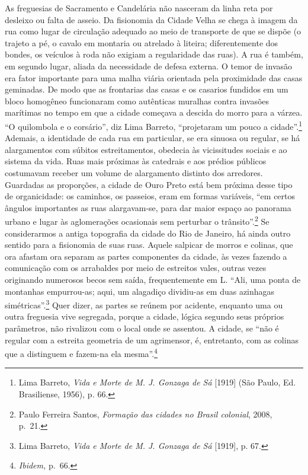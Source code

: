 As freguesias de Sacramento e Candelária não nasceram da linha reta por
desleixo ou falta de asseio. Da fisionomia da Cidade Velha se chega à
imagem da rua como lugar de circulação adequado ao meio de transporte de
que se dispõe (o trajeto a pé, o cavalo em montaria ou atrelado à
liteira; diferentemente dos bondes, os veículos à roda não exigiam a
regularidade das ruas). A rua é também, em segundo lugar, aliada da
necessidade de defesa externa. O temor de invasão era fator importante
para uma malha viária orientada pela proximidade das casas geminadas. De
modo que as frontarias das casas e os casarios fundidos em um bloco
homogêneo funcionaram como autênticas muralhas contra invasões marítimas
no tempo em que a cidade começava a descida do morro para a várzea. ``O
quilombola e o corsário'', diz Lima Barreto, ``projetaram um pouco a
cidade''.\footnote{Lima Barreto, \emph{Vida e Morte de M. J. Gonzaga de
  Sá} {[}1919{]} (São Paulo, Ed. Brasiliense, 1956), p\emph{.} 66.}
Ademais, a identidade de cada rua em particular, se era sinuosa ou
regular, se há alargamentos com súbitos estreitamentos, obedecia às
vicissitudes sociais e ao sistema da vida. Ruas mais próximas às
catedrais e aos prédios públicos costumavam receber um volume de
alargamento distinto dos arredores. Guardadas as proporções, a cidade de
Ouro Preto está bem próxima desse tipo de organicidade: os caminhos, os
passeios, eram em formas variáveis, ``em certos ângulos importantes as
ruas alargavam-se, para dar maior espaço ao panorama urbano e lugar às
aglomerações ocasionais sem perturbar o trânsito''.\footnote{Paulo
  Ferreira Santos, \emph{Formação das cidades no Brasil colonial}, 2008,
  p.~21.} Se considerarmos a antiga topografia da cidade do Rio de
Janeiro, há ainda outro sentido para a fisionomia de suas ruas. Aquele
salpicar de morros e colinas, que ora afastam ora separam as partes
componentes da cidade, às vezes fazendo a comunicação com os arrabaldes
por meio de estreitos vales, outras vezes originando numerosos becos sem
saída, frequentemente em L. ``Ali, uma ponta de montanhas empurrou-as;
aqui, um alagadiço dividiu-as em duas azinhagas simétricas''.\footnote{Lima
  Barreto, \emph{Vida e Morte de M. J. Gonzaga de Sá} {[}1919{]}, p. 67.}
Quer dizer, as partes se reúnem por acidente, enquanto uma ou outra
freguesia vive segregada, porque a cidade, lógica segundo seus próprios
parâmetros, não rivalizou com o local onde se assentou. A cidade, se
``não é regular com a estreita geometria de um agrimensor, é,
entretanto, com as colinas que a distinguem e fazem-na ela
mesma''.\footnote{\emph{Ibidem,} p.~66.}

